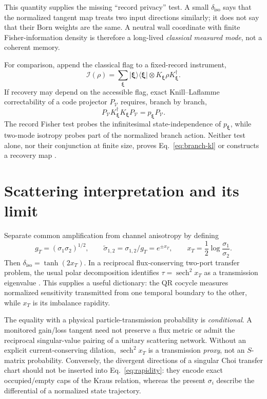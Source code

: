 \documentclass[aps,prb,onecolumn,nofootinbib,superscriptaddress]{revtex4-2}
\newcommand{\cI}{\mathcal{I}}
\newcommand{\cV}{\mathcal{V}}
\newcommand{\bxi}{\boldsymbol{\xi}}
\newcommand{\ketbra}[2]{\lvert #1\rangle\!\langle #2\rvert}
\begin{document}
This quantity supplies the missing ``record privacy'' test.  A small
$\delta_{\mathrm{iso}}$ says that the normalized tangent map treats two input
directions similarly; it does not say that their Born weights are the same.
A neutral wall coordinate with finite Fisher-information density is therefore
a long-lived \emph{classical measured mode}, not a coherent memory.

For comparison, append the classical flag to a fixed-record instrument,
\begin{equation}
 \cI(\rho)=\sum_{\bxi}\ketbra{\bxi}{\bxi}\otimes
 K_{\bxi}\rho K_{\bxi}^\dagger.
 \label{eq:flagged-instrument}
\end{equation}
If recovery may depend on the accessible flag, exact Knill--Laflamme
correctability of a code projector $P_{\cV}$ requires, branch by branch,
\begin{equation}
 P_{\cV}K_{\bxi}^\dagger K_{\bxi}P_{\cV}
 =p_{\bxi}P_{\cV}.
 \label{eq:branch-kl}
\end{equation}
The record Fisher test probes the infinitesimal state-independence of
$p_{\bxi}$, while two-mode isotropy probes part of the normalized branch
action.  Neither test alone, nor their conjunction at finite size, proves
Eq.~\eqref{eq:branch-kl} or constructs a recovery map
\cite{KnillLaflamme1997}.

\section{Scattering interpretation and its limit}
\label{sec:scattering}

Separate common amplification from channel anisotropy by defining
\begin{equation}
 g_T=(\sigma_1\sigma_2)^{1/2},\qquad
 \widetilde\sigma_{1,2}=\sigma_{1,2}/g_T=e^{\pm x_T},
 \qquad
 x_T=\frac12\log\frac{\sigma_1}{\sigma_2}.
 \label{eq:rapidity}
\end{equation}
Then $\delta_{\mathrm{iso}}=\tanh(2x_T)$.  In a reciprocal flux-conserving
two-port transfer problem, the usual polar decomposition identifies
$\tau=\operatorname{sech}^2x_T$ as a transmission eigenvalue
\cite{ChalkerCoddington1988,Beenakker1997}.  This supplies a useful dictionary:
the QR cocycle measures normalized sensitivity transmitted from one temporal
boundary to the other, while $x_T$ is its imbalance rapidity.

The equality with a physical particle-transmission probability is
\emph{conditional}.  A monitored gain/loss tangent need not preserve a flux
metric or admit the reciprocal singular-value pairing of a unitary scattering
network.  Without an explicit current-conserving dilation, $\operatorname{sech}^2
x_T$ is a transmission \emph{proxy}, not an $S$-matrix probability.  Conversely,
the divergent directions of a singular Choi transfer chart should not be
inserted into Eq.~\eqref{eq:rapidity}: they encode exact occupied/empty caps of
the Kraus relation, whereas the present $\sigma_i$ describe the differential
of a normalized state trajectory.
\end{document}
